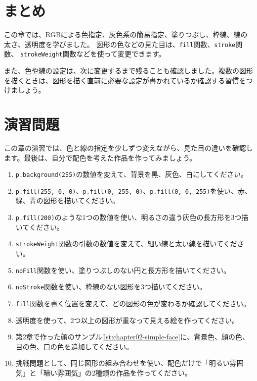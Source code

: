 \section{まとめ}

この章では、RGBによる色指定、灰色系の簡易指定、塗りつぶし、枠線、線の太さ、透明度を学びました。
図形の色などの見た目は、\texttt{fill}関数、\texttt{stroke}関数、
\texttt{strokeWeight}関数などを使って変更できます。

また、色や線の設定は、次に変更するまで残ることも確認しました。複数の図形を描くときは、図形を描く直前に必要な設定が書かれているか確認する習慣をつけましょう。

\section{演習問題}

この章の演習では、色と線の指定を少しずつ変えながら、見た目の違いを確認します。最後は、自分で配色を考えた作品を作ってみましょう。

\begin{enumerate}
    \item \texttt{p.background(255)}の数値を変えて、背景を黒、灰色、白にしてください。
    \item \texttt{p.fill(255, 0, 0)}、\texttt{p.fill(0, 255, 0)}、\texttt{p.fill(0, 0, 255)}を使い、赤、緑、青の図形を描いてください。
    \item \texttt{p.fill(200)}のような1つの数値を使い、明るさの違う灰色の長方形を3つ描いてください。
    \item \texttt{strokeWeight}関数の引数の数値を変えて、細い線と太い線を描いてください。
    \item \texttt{noFill}関数を使い、塗りつぶしのない円と長方形を描いてください。
    \item \texttt{noStroke}関数を使い、枠線のない図形を3つ描いてください。
    \item \texttt{fill}関数を書く位置を変えて、どの図形の色が変わるか確認してください。
    \item 透明度を使って、2つ以上の図形が重なって見える絵を作ってください。
    \item 第2章で作った顔のサンプル\ref{lst:chapter02-simple-face}に、背景色、顔の色、目の色、口の色を追加してください。
    \item 挑戦問題として、同じ図形の組み合わせを使い、配色だけで「明るい雰囲気」と「暗い雰囲気」の2種類の作品を作ってください。
\end{enumerate}
